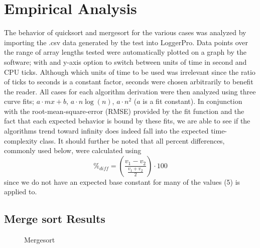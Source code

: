 \documentclass[11pt,letterpaper]{report}
\begin{document}
\section*{Empirical Analysis}
The behavior of quicksort and mergesort for the various cases was analyzed by importing the .csv data generated by the test into LoggerPro. Data points over the range of array lengths tested were automatically plotted on a graph by the software; with and y-axis option to switch between units of time in second and CPU ticks.  Although which units of time to be used was irrelevant since the ratio of ticks to seconds is a constant factor, seconds were chosen arbitrarily to benefit the reader.
All cases for each algorithm derivation were then analyzed using three curve fits; $a \cdot mx+b$, $a \cdot n \log{}(n)$, $a \cdot n^2$ ($a$ is a fit constant). In conjunction with the root-mean-square-error (RMSE) provided by the fit function and the fact that each expected behavior is bound by these fits, we are able to see if the algorithms trend toward infinity does indeed fall into the expected time-complexity class. It should further be noted that all percent differences, commonly used below, were calculated using
\begin{equation} 
\%_{diff}  = (\frac{v_1-v_2}{\frac{v_1+v_2}{2}})  \cdot 100
\end{equation}
since we do not have an expected base constant for many of the values (5) is applied to. 



\subsection*{Merge sort Results}
\begin{figure}[h]
  \centering
  \hfill
  \hfill
  \caption{Mergesort}
\end{figure}
\end{document}
